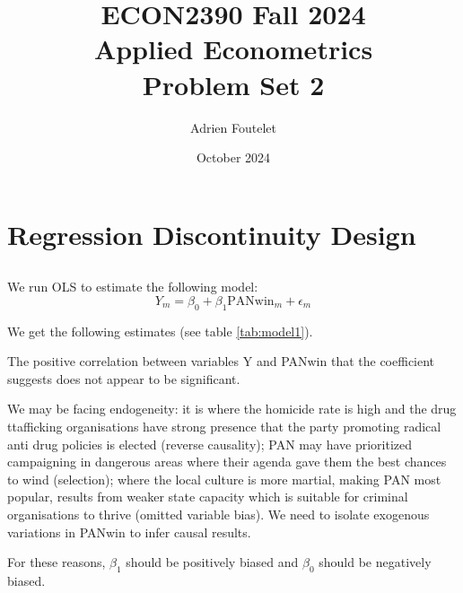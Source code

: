 \documentclass{article}
\title{ECON2390 Fall 2024\\Applied Econometrics\\Problem Set 2}
\author{Adrien Foutelet}
\date{October 2024}
\begin{document}
\maketitle

\section{Regression Discontinuity Design}

\subsection{}

We run OLS to estimate the following model:
\[Y_m = \beta_0 + \beta_1 \text{PANwin}_m + \epsilon_m\]

We get the following estimates (see table \ref{tab:model1}).



The positive correlation between variables Y and PANwin that the coefficient suggests does not appear to be significant.

We may be facing endogeneity: it is where the homicide rate is high and the drug ttafficking organisations have strong presence that the party promoting radical anti drug policies is elected (reverse causality); PAN may have prioritized campaigning in dangerous areas where their agenda gave them the best chances to wind (selection); where the local culture is more martial, making PAN most popular, results from weaker state capacity which is suitable for criminal organisations to thrive (omitted variable bias). We need to isolate exogenous variations in PANwin to infer causal results.

For these reasons, \(\beta_1\) should be positively biased and \(\beta_0\) should be negatively biased.

\subsection{}
\end{document}
